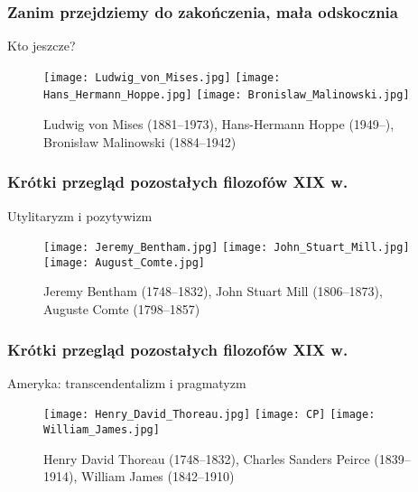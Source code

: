 \documentclass{beamer}  %
\begin{document}
\begin{frame}
  \frametitle{Zanim przejdziemy do zakończenia, mała odskocznia}

  \begin{block}{Kto jeszcze?}
    \begin{figure}
      \centering

      \texttt{[image: Ludwig\_von\_Mises.jpg]}
      \texttt{[image: Hans\_Hermann\_Hoppe.jpg]}
      \texttt{[image: Bronislaw\_Malinowski.jpg]}

      \caption{Ludwig von Mises (1881--1973), Hans-Hermann Hoppe
        \newline (1949--), Bronisław Malinowski (1884--1942)}
    \end{figure}
  \end{block}

\end{frame}



\begin{frame}
  \frametitle{Krótki przegląd pozostałych filozofów XIX w.}

  \begin{block}{Utylitaryzm i pozytywizm}
    \begin{figure}
      \centering

      \texttt{[image: Jeremy\_Bentham.jpg]}
      \texttt{[image: John\_Stuart\_Mill.jpg]}
      \texttt{[image: August\_Comte.jpg]}

      \caption{Jeremy Bentham (1748--1832), John Stuart Mill
        (1806--1873), Auguste Comte (1798--1857)}
    \end{figure}
  \end{block}

\end{frame}



\begin{frame}
  \frametitle{Krótki przegląd pozostałych filozofów XIX w.}

  \begin{block}{Ameryka: transcendentalizm i pragmatyzm}
    \begin{figure}
      \centering

      \texttt{[image: Henry\_David\_Thoreau.jpg]}
      \texttt{[image: CP]}
      \texttt{[image: William\_James.jpg]}
      
      \caption{Henry David Thoreau (1748--1832), Charles Sanders
        Peirce (1839--1914), William James (1842--1910)}
    \end{figure}
  \end{block}

\end{frame}
\end{document}
